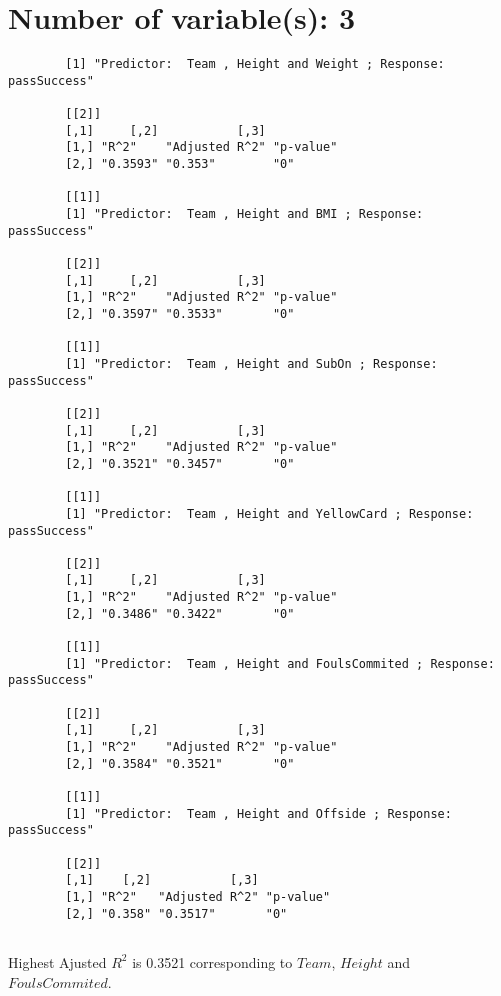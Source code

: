 \documentclass[12pt]{article}
\begin{document}
	\section{Number of variable(s): 3}
	\begin{verbatim}
		[1] "Predictor:  Team , Height and Weight ; Response:  passSuccess"
		
		[[2]]
		[,1]     [,2]           [,3]     
		[1,] "R^2"    "Adjusted R^2" "p-value"
		[2,] "0.3593" "0.353"        "0"      
		
		[[1]]
		[1] "Predictor:  Team , Height and BMI ; Response:  passSuccess"
		
		[[2]]
		[,1]     [,2]           [,3]     
		[1,] "R^2"    "Adjusted R^2" "p-value"
		[2,] "0.3597" "0.3533"       "0"      
		
		[[1]]
		[1] "Predictor:  Team , Height and SubOn ; Response:  passSuccess"
		
		[[2]]
		[,1]     [,2]           [,3]     
		[1,] "R^2"    "Adjusted R^2" "p-value"
		[2,] "0.3521" "0.3457"       "0"      
		
		[[1]]
		[1] "Predictor:  Team , Height and YellowCard ; Response:  passSuccess"
		
		[[2]]
		[,1]     [,2]           [,3]     
		[1,] "R^2"    "Adjusted R^2" "p-value"
		[2,] "0.3486" "0.3422"       "0"      
		
		[[1]]
		[1] "Predictor:  Team , Height and FoulsCommited ; Response:  passSuccess"
		
		[[2]]
		[,1]     [,2]           [,3]     
		[1,] "R^2"    "Adjusted R^2" "p-value"
		[2,] "0.3584" "0.3521"       "0"      
		
		[[1]]
		[1] "Predictor:  Team , Height and Offside ; Response:  passSuccess"
		
		[[2]]
		[,1]    [,2]           [,3]     
		[1,] "R^2"   "Adjusted R^2" "p-value"
		[2,] "0.358" "0.3517"       "0"    
		    
	\end{verbatim}
	Highest Ajusted $ R^2 $ is 0.3521 corresponding to $ Team $, $ Height $ and $ FoulsCommited $.
	
\end{document}
